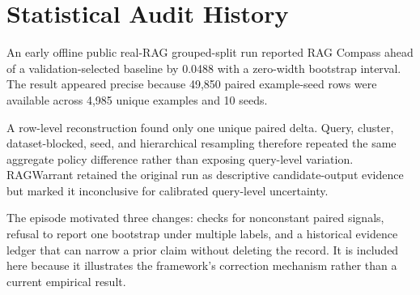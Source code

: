 \documentclass[11pt]{article}
\begin{document}
\section{Statistical Audit History}\label{app:audit}

An early offline public real-RAG grouped-split run reported RAG Compass
ahead of a validation-selected baseline by 0.0488 with a zero-width
bootstrap interval. The result appeared precise because 49,850 paired
example-seed rows were available across 4,985 unique examples and 10
seeds.

A row-level reconstruction found only one unique paired delta. Query,
cluster, dataset-blocked, seed, and hierarchical resampling therefore
repeated the same aggregate policy difference rather than exposing
query-level variation. RAGWarrant retained the original run as
descriptive candidate-output evidence but marked it inconclusive for
calibrated query-level uncertainty.

The episode motivated three changes: checks for nonconstant paired
signals, refusal to report one bootstrap under multiple labels, and a
historical evidence ledger that can narrow a prior claim without
deleting the record. It is included here because it illustrates the
framework's correction mechanism rather than a current
empirical result.
\end{document}
